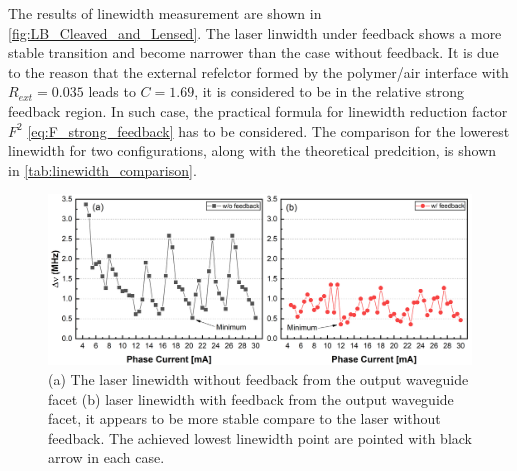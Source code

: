 The results of linewidth measurement are shown in \autoref{fig:LB_Cleaved_and_Lensed}. The laser linwidth under feedback shows a more stable transition and become narrower than the case without feedback. It is due to the reason that the external refelctor formed by the polymer/air interface with $R_{ext}=0.035$ leads to $C=1.69$, it is considered to be in the relative strong feedback region. In such case, the practical formula for linewidth reduction factor $F^2$ \autoref{eq:F_strong_feedback} has to be considered. The comparison for the lowerest linewidth for two configurations, along with the theoretical predcition, is shown in \autoref{tab:linewidth_comparison}.

\begin{figure}[H]
    \centering
    \includegraphics[width=\linewidth]{figures/LB_Cleaved_and_Lensed.png}
    \caption{(a) The laser linewidth without feedback from the output waveguide facet (b) laser linewidth with feedback from the output waveguide facet, it appears to be more stable compare to the laser without feedback. The achieved lowest linewidth point are pointed with black arrow in each case.}
    \label{fig:LB_Cleaved_and_Lensed}
\end{figure}


